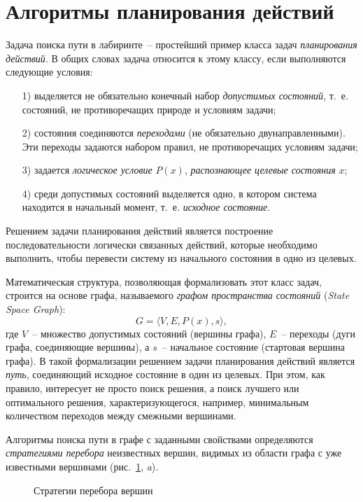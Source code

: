 \documentclass[a4paper,14pt, openany, twoside, final]{extbook} %
\newcommand{\eeng}[1]{\emph{\foreignlanguage{english}{#1}}}
\begin{document}
\section{Алгоритмы планирования действий}
\label{sec:problemsolving}

Задача поиска пути в лабиринте~-- простейший пример класса задач \emph{планирования действий}.  В общих словах задача относится к этому классу, если выполняются следующие условия:
\begin{enumerate}
\item[1)] выделяется не обязательно конечный набор \emph{допустимых состояний}, т.~е. состояний, не противоречащих природе и условиям задачи;
\item[2)] состояния соединяются \emph{переходами} (не обязательно двунаправленными). Эти переходы задаются набором правил, не противоречащих условиям задачи;
\item[3)] задается \emph{логическое условие} $P(x)$, \emph{распознающее целевые состояния} $x$;
\item[4)] среди допустимых состояний выделяется одно, в котором система находится в начальный момент, т.~е. \emph{исходное состояние}.
\end{enumerate}
Решением задачи планирования действий является построение последовательности логически связанных действий, которые необходимо выполнить, чтобы перевести систему из начального состояния в одно из целевых.

Математическая структура, позволяющая формализовать этот класс задач, строится на основе графа, называемого \emph{графом пространства состояний} (\eeng{State Space Graph}):
$$
G=\langle V,E, P(x), s\rangle,
$$
где $V$~-- множество допустимых состояний (вершины графа), $E$~-- переходы (дуги графа, соединяющие вершины), а $s$~-- начальное состояние (стартовая вершина графа).  В такой формализации решением задачи планирования действий является \emph{путь}, соединяющий исходное состояние в один из целевых.  При этом, как правило, интересует не просто поиск решения, а поиск лучшего или оптимального решения, характеризующегося, например, минимальным количеством переходов между смежными вершинами.

Алгоритмы поиска пути в графе с заданными свойствами определяются \emph{стратегиями перебора} неизвестных вершин, видимых из области графа с уже известными вершинами (рис.~\ref{fig:searchdescr}, \emph{a}).
\begin{figure}[hbtp]
  \centering
  \def\svgwidth{\columnwidth}
  \footnotesize\itshape
  \def\zb{\normalsize $D$}
  \def\ya{\footnotesize\it a)}
  \def\yb{\footnotesize\it b)}
  \def\yc{\footnotesize\it c)}
  
  \caption{Стратегии перебора вершин}
  \label{fig:searchdescr}
\end{figure}
\end{document}
